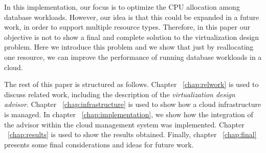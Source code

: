 In this implementation, our focus is to optimize the CPU allocation among database workloads. However, our idea is that this could be expanded in a future work, in order to support multiple resource types. Therefore, in this paper our objective is not to show a final and complete solution to the virtualization design problem. Here we introduce this problem and we show that just by reallocating one resource, we can improve the performance of running database workloads in a cloud. 

The rest of this paper is structured as follows. Chapter ~\ref{chap:relwork} is used to discuss related work, including the description of the \textit{virtualization design advisor}. Chapter ~\ref{chap:infrastructure} is used to show how a cloud infrastructure is managed. In chapter ~\ref{chap:implementation}, we show how the integration of the advisor within the cloud management system was implemented. Chapter ~\ref{chap:results} is used to show the results obtained. Finally, chapter ~\ref{chap:final} presents some final considerations and ideas for future work.

